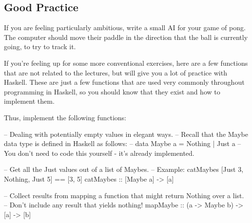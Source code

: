 \documentclass{article}
\begin{document}
\subsection*{Good Practice}
If you are feeling particularly ambitious, write a small AI for your game of pong. The computer
should move their paddle in the direction that the ball is currently going, to try to track it.

If you're feeling up for some more conventional exercises, here are a few functions that are not
related to the lectures, but will give you a lot of practice with Haskell.  These are just a few
functions that are used very commonly throughout programming in Haskell, so you should know that
they exist and how to implement them.

Thus, implement the following functions:
\begin{haskellcode}
-- Dealing with potentially empty values in elegant ways.
-- Recall that the Maybe data type is defined in Haskell as follows:
--     data Maybe a = Nothing | Just a
-- You don't need to code this yourself - it's already implemented.

-- Get all the Just values out of a list of Maybes.
-- Example: catMaybes [Just 3, Nothing, Just 5] == [3, 5]
catMaybes :: [Maybe a] -> [a]

-- Collect results from mapping a function that might return Nothing over a list.
-- Don't include any result that yields nothing!
mapMaybe :: (a -> Maybe b) -> [a] -> [b]
\end{haskellcode}
\end{document}
